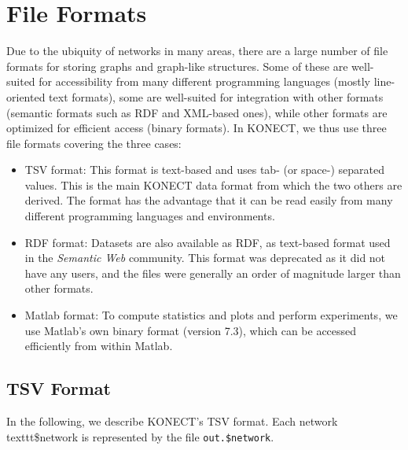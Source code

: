 \documentclass{article}
\begin{document}
\section{File Formats}
\label{sec:format}
Due to the ubiquity of networks in many areas, there are a large number
of file formats for storing graphs and graph-like structures.  Some of
these are well-suited for accessibility from many different programming
languages (mostly line-oriented text formats), some are well-suited for
integration with other formats (semantic formats such as RDF and
XML-based ones), while other formats are optimized for efficient access
(binary formats).  In KONECT, we thus use three file formats covering
the three cases:
\begin{itemize}
\item TSV format: This format is text-based and uses tab- (or space-) separated 
  values.  This is the main KONECT data format from which the two others
  are derived.  The format has the advantage that it can be read easily
  from many different programming languages and environments.
\item RDF format: Datasets are also available as RDF, as text-based
  format used in the \emph{Semantic Web} community.  
  This format was deprecated as it did not have any users, and the files
  were generally an order of magnitude larger than other formats. 
\item Matlab format: To compute statistics and plots and perform
  experiments, we use Matlab's own binary format (version 7.3), which can be accessed
  efficiently from within Matlab.
\end{itemize}

\subsection{TSV Format}
In the following, we describe KONECT's TSV format.  Each network
texttt{\$network} is represented by the file \texttt{out.\$network}. 
\end{document}
